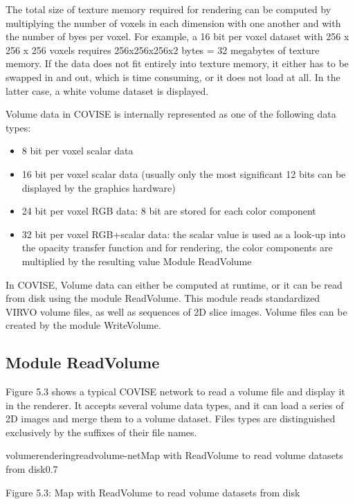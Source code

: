 The total size of texture memory required for rendering can be computed by multiplying the number of voxels 
in each dimension with one another and with the number of byes per voxel. For example, a 16 bit per voxel dataset 
with 256 x 256 x 256 voxels requires 256x256x256x2 bytes = 32 megabytes of texture memory. If the data does not 
fit entirely into texture memory, it either has to be swapped in and out, which is time consuming, or it does 
not load at all. In the latter case, a white volume dataset is displayed.

Volume data in COVISE is internally represented as one of the following data types:

\begin{itemize}
\item 8 bit per voxel scalar data
\item 16 bit per voxel scalar data (usually only the most significant 12 bits can be displayed by the graphics hardware) 
\item 24 bit per voxel RGB data: 8 bit are stored for each color component 
\item 32 bit per voxel RGB+scalar data: the scalar value is used as a look-up into the opacity transfer function 
and for rendering, the color components are multiplied by the resulting value Module ReadVolume
\end{itemize}

In COVISE, Volume data can either be computed at runtime, or it can be read from disk using the 
module ReadVolume. This module reads standardized VIRVO volume files, as well as sequences of 2D slice images. 
Volume files can be created by the module WriteVolume.

\subsection{Module ReadVolume}

Figure 5.3 shows a typical COVISE network to read a volume file and display it in the renderer. 
It accepts several volume data types, and it can load a series of 2D images and merge 
them to a volume dataset. Files types are distinguished exclusively by the suffixes of their file names.

\begin{covimg}{volumerendering}{readvolume-net}{Map with ReadVolume to read volume datasets from disk}{0.7}\end{covimg}
\begin{htmlonly}
Figure 5.3: Map with ReadVolume to read volume datasets from disk
\vspace{0.5cm}
\end{htmlonly}

